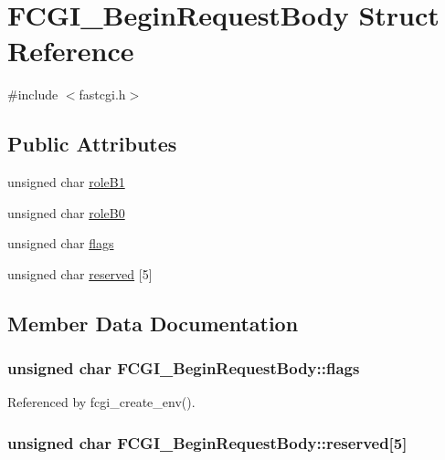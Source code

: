 \hypertarget{structFCGI__BeginRequestBody}{\section{F\-C\-G\-I\-\_\-\-Begin\-Request\-Body Struct Reference}
\label{structFCGI__BeginRequestBody}
}


{\ttfamily \#include $<$fastcgi.\-h$>$}

\subsection*{Public Attributes}
\begin{DoxyCompactItemize}
\item 
unsigned char \hyperlink{structFCGI__BeginRequestBody_a217f1ebe37176c39018fa2ad62d8ccd7}{role\-B1}
\item 
unsigned char \hyperlink{structFCGI__BeginRequestBody_abaa663440aaab2d668f7c22083a5366e}{role\-B0}
\item 
unsigned char \hyperlink{structFCGI__BeginRequestBody_ae994cb4927a43eaabbdabd2425f17e5f}{flags}
\item 
unsigned char \hyperlink{structFCGI__BeginRequestBody_a052c4662b5297083c5e9b760b5c05fe9}{reserved} \mbox{[}5\mbox{]}
\end{DoxyCompactItemize}


\subsection{Member Data Documentation}
\hypertarget{structFCGI__BeginRequestBody_ae994cb4927a43eaabbdabd2425f17e5f}{
\subsubsection[{flags}]{\setlength{\rightskip}{0pt plus 5cm}unsigned char F\-C\-G\-I\-\_\-\-Begin\-Request\-Body\-::flags}}\label{structFCGI__BeginRequestBody_ae994cb4927a43eaabbdabd2425f17e5f}


Referenced by fcgi\-\_\-create\-\_\-env().

\hypertarget{structFCGI__BeginRequestBody_a052c4662b5297083c5e9b760b5c05fe9}{
\subsubsection[{reserved}]{\setlength{\rightskip}{0pt plus 5cm}unsigned char F\-C\-G\-I\-\_\-\-Begin\-Request\-Body\-::reserved\mbox{[}5\mbox{]}}}\label{structFCGI__BeginRequestBody_a052c4662b5297083c5e9b760b5c05fe9}


